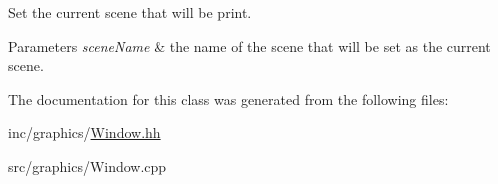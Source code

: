 Set the current scene that will be print. 


\begin{DoxyParams}{Parameters}
{\em \textquotesingle{}scene\+Name\textquotesingle{}} & the name of the scene that will be set as the current scene. \\
\hline
\end{DoxyParams}


The documentation for this class was generated from the following files\+:\begin{DoxyCompactItemize}
\item 
inc/graphics/\hyperlink{Window_8hh}{Window.\+hh}\item 
src/graphics/Window.\+cpp\end{DoxyCompactItemize}

